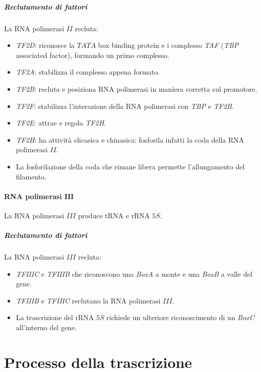 				\subparagraph{Reclutamento di fattori}
				La RNA polimerasi $II$ recluta:
				\begin{multicols}{2}
					\begin{itemize}
						\item \emph{TF2D}: riconosce la $TATA$ box binding protein e i complesso \emph{TAF} (\emph{TBP} associated factor), formando un primo complesso.
						\item \emph{TF2A}: stabilizza il complesso appena formato.
						\item \emph{TF2B}: recluta e posiziona RNA polimerasi in maniera corretta sul promotore.
						\item \emph{TF2F}: stabilizza l'interazione della RNA polimerasi con \emph{TBP} e \emph{TF2B}.
						\item \emph{TF2E}: attrae e regola \emph{TF2H}.
						\item \emph{TF2H}: ha attivit\`a elicasica e chinasica: fosforila infatti la coda della RNA polimerasi $II$.
						\item La fosforilazione della coda che rimane libera permette l'allungamento del filamento.
					\end{itemize}
				\end{multicols}

			\paragraph{RNA polimerasi $\mathbf{III}$}
			La RNA polimerasi $III$ produce tRNA e rRNA $5S$.

				\subparagraph{Reclutamento di fattori}
				La RNA polimerasi $III$ recluta:
				\begin{multicols}{2}
					\begin{itemize}
						\item \emph{TFIIIC} e \emph{TFIIIB} che riconoscono una \emph{BoxA} a monte e una \emph{BoxB} a valle del gene.
						\item \emph{TFIIIB} e \emph{TFIIIC} reclutano la RNA polimerasi $III$.
						\item La trascrizione del rRNA $5S$ richiede un ulteriore riconoscimento di un \emph{BoxC} all'interno del gene.
					\end{itemize}
				\end{multicols}



\section{Processo della trascrizione}

